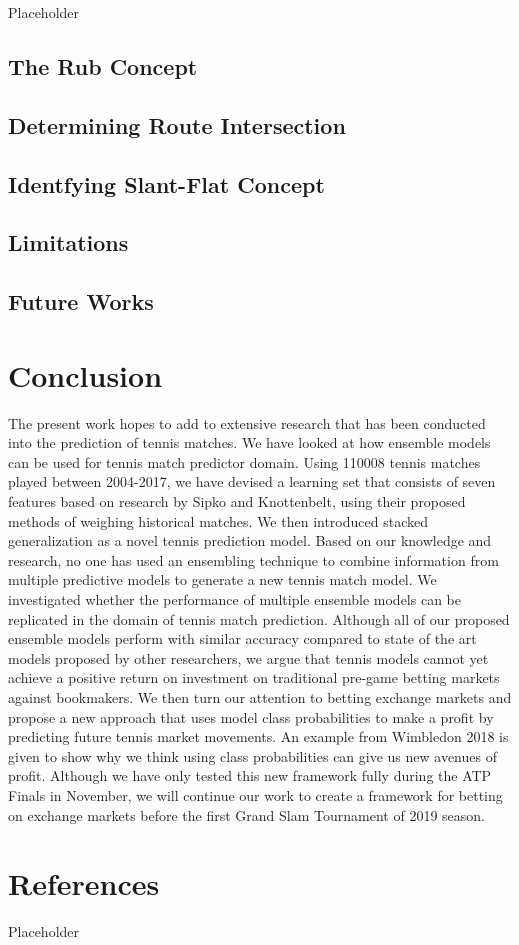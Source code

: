 \documentclass[12pt,oneside]{dukestatscithesis}
\theoremstyle{definition}
\theoremstyle{definition}
\theoremstyle{definition}
\theoremstyle{remark}
\begin{document}
Placeholder

\section{The Rub Concept}\label{the-rub-concept}

\section{Determining Route
Intersection}\label{determining-route-intersection}

\section{Identfying Slant-Flat
Concept}\label{identfying-slant-flat-concept}

\section{Limitations}\label{limitations}

\section{Future Works}\label{future-works}

\chapter*{Conclusion}\label{conclusion}

The present work hopes to add to extensive research that has been
conducted into the prediction of tennis matches. We have looked at how
ensemble models can be used for tennis match predictor domain. Using
110008 tennis matches played between 2004-2017, we have devised a
learning set that consists of seven features based on research by Sipko
and Knottenbelt, using their proposed methods of weighing historical
matches. We then introduced stacked generalization as a novel tennis
prediction model. Based on our knowledge and research, no one has used
an ensembling technique to combine information from multiple predictive
models to generate a new tennis match model. We investigated whether the
performance of multiple ensemble models can be replicated in the domain
of tennis match prediction. Although all of our proposed ensemble models
perform with similar accuracy compared to state of the art models
proposed by other researchers, we argue that tennis models cannot yet
achieve a positive return on investment on traditional pre-game betting
markets against bookmakers. We then turn our attention to betting
exchange markets and propose a new approach that uses model class
probabilities to make a profit by predicting future tennis market
movements. An example from Wimbledon 2018 is given to show why we think
using class probabilities can give us new avenues of profit. Although we
have only tested this new framework fully during the ATP Finals in
November, we will continue our work to create a framework for betting on
exchange markets before the first Grand Slam Tournament of 2019 season.

\chapter*{References}\label{references}

Placeholder


\end{document}
